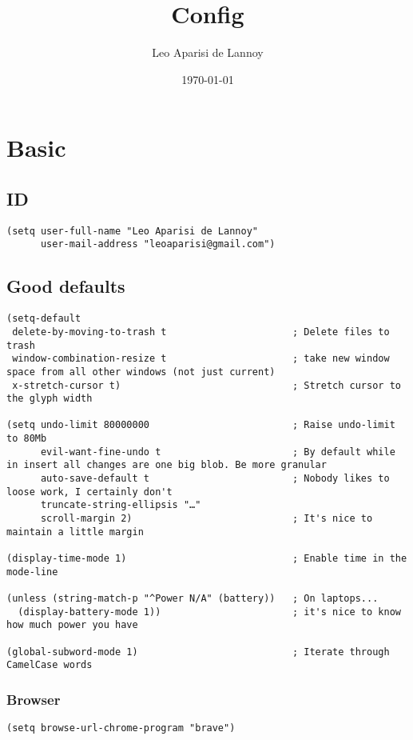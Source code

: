 \documentclass[c]{article}
\author{Leo Aparisi de Lannoy}
\date{\today}
\title{Config}
\theoremstyle{plain}%
\theoremstyle{definition}
\theoremstyle{remark}
\begin{document}
\maketitle
\tableofcontents

\section{Basic}
\label{sec:orgeb9b387}
\subsection{ID}
\label{sec:org7e0270a}
\begin{verbatim}
(setq user-full-name "Leo Aparisi de Lannoy"
      user-mail-address "leoaparisi@gmail.com")
\end{verbatim}
\subsection{Good defaults}
\label{sec:orgfc0f4fb}
\begin{verbatim}
(setq-default
 delete-by-moving-to-trash t                      ; Delete files to trash
 window-combination-resize t                      ; take new window space from all other windows (not just current)
 x-stretch-cursor t)                              ; Stretch cursor to the glyph width

(setq undo-limit 80000000                         ; Raise undo-limit to 80Mb
      evil-want-fine-undo t                       ; By default while in insert all changes are one big blob. Be more granular
      auto-save-default t                         ; Nobody likes to loose work, I certainly don't
      truncate-string-ellipsis "…"
      scroll-margin 2)                            ; It's nice to maintain a little margin

(display-time-mode 1)                             ; Enable time in the mode-line

(unless (string-match-p "^Power N/A" (battery))   ; On laptops...
  (display-battery-mode 1))                       ; it's nice to know how much power you have

(global-subword-mode 1)                           ; Iterate through CamelCase words
\end{verbatim}
\subsubsection{Browser}
\label{sec:org66f9711}
\begin{verbatim}
(setq browse-url-chrome-program "brave")
\end{verbatim}
\end{document}
